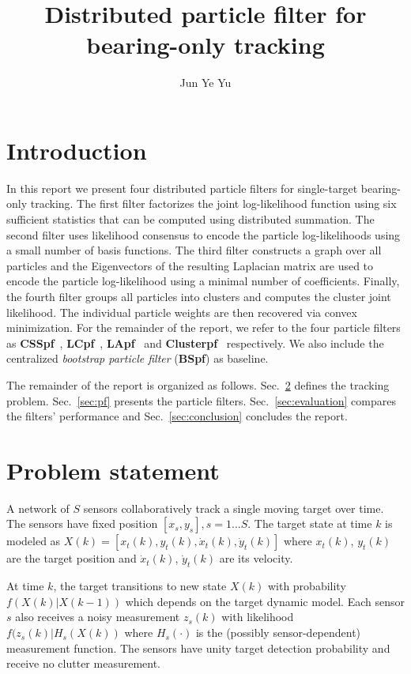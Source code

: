 \documentclass[10pt,letterpaper,final]{article}
\author{Jun Ye Yu}
\title{Distributed particle filter for bearing-only tracking}
\begin{document}
\maketitle

\section{Introduction}
In this report we present four distributed particle filters for single-target bearing-only tracking. The first filter factorizes the joint log-likelihood function using six sufficient statistics that can be computed using distributed summation. The second filter uses likelihood consensus to encode the particle log-likelihoods using a small number of basis functions. The third filter constructs a graph over all particles and the Eigenvectors of the resulting Laplacian matrix are used to encode the particle log-likelihood using a minimal number of coefficients. Finally, the fourth filter groups all particles into clusters and computes the cluster joint likelihood. The individual particle weights are then recovered via convex minimization. For the remainder of the report, we refer to the four particle filters as \textbf{CSSpf}~\cite{Mohammadi2012}, \textbf{LCpf}~\cite{Hlinka2012}, \textbf{LApf}~\cite{Rabbat2016} and \textbf{Clusterpf}~\cite{Chao2015} respectively. We also include the centralized \textit{bootstrap particle filter} (\textbf{BSpf}) as baseline. 

The remainder of the report is organized as follows. Sec.~\ref{sec:problem} defines the tracking problem. Sec.~\ref{sec:pf} presents the particle filters. Sec.~\ref{sec:evaluation} compares the filters' performance and Sec.~\ref{sec:conclusion} concludes the report. 

\section{Problem statement}
\label{sec:problem}
A network of $S$ sensors collaboratively track a single moving target over time. The sensors have fixed position $[x_s, y_s], s=1...S$. The target state at time $k$ is modeled as $X(k) = [x_t(k),y_t(k), \dot{x}_t(k), \dot{y}_t(k)]$ where $x_t(k)$, $y_t(k)$ are the target position and $\dot{x}_t(k)$, $\dot{y}_t(k)$ are its velocity. 

At time $k$, the target transitions to new state $X(k)$ with probability $f(X(k)|X(k-1))$ which depends on the target dynamic model. Each sensor $s$ also receives a noisy measurement $z_s(k)$ with likelihood $f(z_s(k)|H_s(X(k))$ where $H_s(\cdot)$ is the (possibly sensor-dependent) measurement function. The sensors have unity target detection probability and receive no clutter measurement. 
\end{document}
